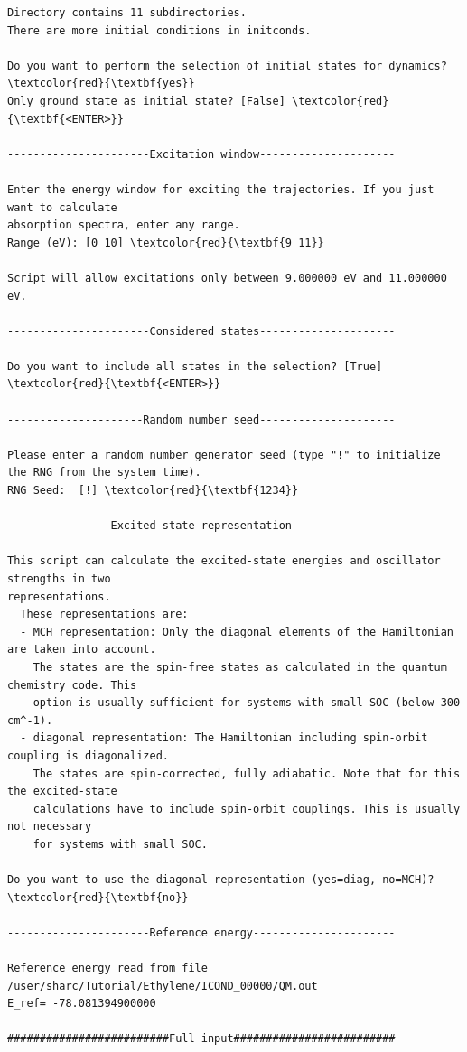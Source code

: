 \documentclass[a4paper,11pt,DIV=15,openany]{scrbook}
\begin{document}
\begin{oframed}
\begin{Verbatim}[commandchars=\\\{\}]
Directory contains 11 subdirectories.
There are more initial conditions in initconds.

Do you want to perform the selection of initial states for dynamics? \textcolor{red}{\textbf{yes}}
Only ground state as initial state? [False] \textcolor{red}{\textbf{<ENTER>}}

----------------------Excitation window---------------------

Enter the energy window for exciting the trajectories. If you just want to calculate 
absorption spectra, enter any range.
Range (eV): [0 10] \textcolor{red}{\textbf{9 11}}

Script will allow excitations only between 9.000000 eV and 11.000000 eV.

----------------------Considered states---------------------

Do you want to include all states in the selection? [True] \textcolor{red}{\textbf{<ENTER>}}

---------------------Random number seed---------------------

Please enter a random number generator seed (type "!" to initialize the RNG from the system time).
RNG Seed:  [!] \textcolor{red}{\textbf{1234}}

----------------Excited-state representation----------------

This script can calculate the excited-state energies and oscillator strengths in two 
representations.
  These representations are:
  - MCH representation: Only the diagonal elements of the Hamiltonian are taken into account. 
    The states are the spin-free states as calculated in the quantum chemistry code. This 
    option is usually sufficient for systems with small SOC (below 300 cm^-1).
  - diagonal representation: The Hamiltonian including spin-orbit coupling is diagonalized. 
    The states are spin-corrected, fully adiabatic. Note that for this the excited-state 
    calculations have to include spin-orbit couplings. This is usually not necessary 
    for systems with small SOC.

Do you want to use the diagonal representation (yes=diag, no=MCH)? \textcolor{red}{\textbf{no}}

----------------------Reference energy----------------------

Reference energy read from file 
/user/sharc/Tutorial/Ethylene/ICOND_00000/QM.out
E_ref= -78.081394900000

#########################Full input#########################


\end{Verbatim}
\end{oframed}
\end{document}

